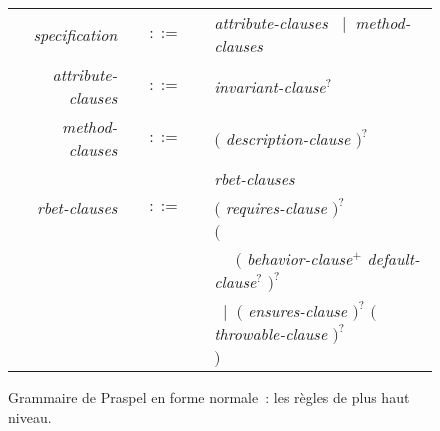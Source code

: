 \def\gsep{$\quad::=\quad$}
\def\mvert{$\;\;|\;\;$}
\newcommand{\token}[1]{\underline{\code{php-#1}}}
\newcommand{\grule}[1]{\textit{#1}}

\begin{figure}
\centering
\begin{tabular}{rcl}
\grule{specification} & \gsep &
    \grule{attribute-clauses} \mvert \grule{method-clauses} \\

\grule{attribute-clauses} & \gsep &
    \grule{invariant-clause}$^?$ \\

\grule{method-clauses} & \gsep &
    $($ \grule{description-clause} \code{;} $)^?$ \\ & &
    \grule{rbet-clauses} \\

\grule{rbet-clauses} & \gsep &
    $($ \grule{requires-clause} \code{;} $)^?$ \\ & &
    $($ \\ & &
    $\quad\,\,($ \grule{behavior-clause}$^+$ \grule{default-clause}$^?$ $)^?$ \\ & &
    \mvert $($ \grule{ensures-clause} \code{;} $)^?$
    $($ \grule{throwable-clause} \code{;} $)^?$ \\ & &
    $)$ \\
\end{tabular}

\caption{\label{figure:language:grammar_part0} Grammaire de Praspel en forme
normale~: les règles de plus haut niveau.}

\end{figure}

